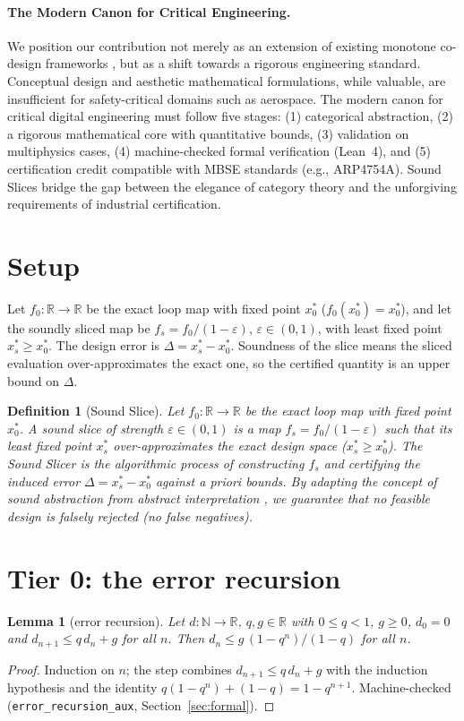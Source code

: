 \documentclass[11pt]{article}
\newtheorem{lemma}{Lemma}[section]
\newtheorem{definition}{Definition}[section]
\numberwithin{equation}{section}
\begin{document}
\paragraph{The Modern Canon for Critical Engineering.}
We position our contribution not merely as an extension of existing monotone co-design frameworks \cite{zardini2020,zardini2021}, but as a shift towards a rigorous engineering standard. Conceptual design and aesthetic mathematical formulations, while valuable, are insufficient for safety-critical domains such as aerospace. The modern canon for critical digital engineering must follow five stages: (1) categorical abstraction, (2) a rigorous mathematical core with quantitative bounds, (3) validation on multiphysics cases, (4) machine-checked formal verification (Lean~4), and (5) certification credit compatible with MBSE standards (e.g., ARP4754A). Sound Slices bridge the gap between the elegance of category theory and the unforgiving requirements of industrial certification.

\section{Setup}
Let $f_0:\mathbb{R}\to\mathbb{R}$ be the exact loop map with fixed point
$x_0^*$ ($f_0(x_0^*)=x_0^*$), and let the soundly sliced map be
$f_s = f_0/(1-\varepsilon)$, $\varepsilon\in(0,1)$, with least fixed point
$x_s^*\ge x_0^*$. The design error is $\Delta = x_s^*-x_0^*$.
Soundness of the slice means the sliced evaluation over-approximates the exact
one, so the certified quantity is an upper bound on $\Delta$.

\begin{definition}[Sound Slice]
Let $f_0:\mathbb{R}\to\mathbb{R}$ be the exact loop map with fixed point $x_0^*$. A \emph{sound slice} of strength $\varepsilon \in (0,1)$ is a map $f_s = f_0/(1-\varepsilon)$ such that its least fixed point $x_s^*$ over-approximates the exact design space ($x_s^* \ge x_0^*$). The \emph{Sound Slicer} is the algorithmic process of constructing $f_s$ and certifying the induced error $\Delta = x_s^* - x_0^*$ against a priori bounds. By adapting the concept of sound abstraction from abstract interpretation \cite{cousot1977}, we guarantee that no feasible design is falsely rejected (no false negatives).
\end{definition}

\section{Tier 0: the error recursion}
\begin{lemma}[error recursion]\label{lem:rec}
Let $d:\mathbb{N}\to\mathbb{R}$, $q,g\in\mathbb{R}$ with $0\le q<1$, $g\ge 0$,
$d_0=0$ and $d_{n+1}\le q\,d_n+g$ for all $n$. Then
$d_n \le g\,(1-q^n)/(1-q)$ for all $n$.
\end{lemma}
\begin{proof}
Induction on $n$; the step combines $d_{n+1}\le q\,d_n+g$ with the induction
hypothesis and the identity $q(1-q^n)+(1-q)=1-q^{n+1}$. Machine-checked
(\texttt{error\_recursion\_aux}, Section~\ref{sec:formal}).
\end{proof}
\end{document}
